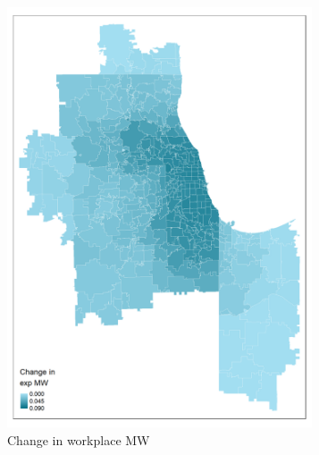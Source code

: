 \documentclass[aspectratio=169, t]{beamer}
\begin{document}
\begin{frame}[label = example_pred_chi_07_2019]
\begin{figure}
\begin{subfigure}{0.33\textwidth}
                         \includegraphics[width = 0.99\textwidth]{maps_events/output/chicago2019-6_exp_mw.png}
			\caption*{Change in workplace MW}
		\end{subfigure}
		\begin{subfigure}{0.33\textwidth}

\end{subfigure}
\end{figure}
\end{frame}
\end{document}

